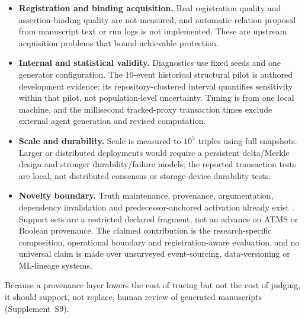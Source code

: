\documentclass[cmc,article,submit,moreauthors,pdftex]{Definitions/tsp}
\newcommand{\suppl}[1]{Supplement~#1}
\begin{document}
\begin{itemize}
    \item \textbf{Registration and binding acquisition.} Real registration quality and assertion-binding quality are not measured, and automatic relation proposal from manuscript text or run logs is not implemented. These are upstream acquisition problems that bound achievable protection.
    \item \textbf{Internal and statistical validity.} Diagnostics use fixed seeds and one generator configuration. The 10-event historical structural pilot is authored development evidence; its repository-clustered interval quantifies sensitivity within that pilot, not population-level uncertainty. Timing is from one local machine, and the millisecond tracked-proxy transaction times exclude external agent generation and revised computation.
    \item \textbf{Scale and durability.} Scale is measured to $10^5$ triples using full snapshots. Larger or distributed deployments would require a persistent delta/Merkle design and stronger durability/failure models; the reported transaction tests are local, not distributed consensus or storage-device durability tests.
    \item \textbf{Novelty boundary.} Truth maintenance, provenance, argumentation, dependency invalidation and predecessor-anchored activation already exist \cite{doyle1979tms,buneman2001provenance,dung1995acceptability,feldman1979make,he2026continuity}. Support sets are a restricted declared fragment, not an advance on ATMS or Boolean provenance. The claimed contribution is the research-specific composition, operational boundary and registration-aware evaluation, and no universal claim is made over unsurveyed event-sourcing, data-versioning or ML-lineage systems.
\end{itemize}
Because a provenance layer lowers the cost of tracing but not the cost of judging, it should support, not replace, human review of generated manuscripts (\suppl{S9}).
\end{document}
